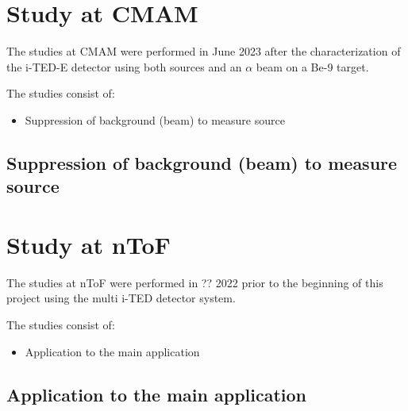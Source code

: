 \section{Study at \ac{CMAM}}

The studies at \ac{CMAM} were performed in June 2023 after the characterization of the \ac{i-TED}-E detector using both sources and an $\alpha$ beam on a Be-9 target.

The studies consist of:
\begin{itemize}
    \item Suppression of background (beam) to measure source
\end{itemize}

\subsection{Suppression of background (beam) to measure source}

\section{Study at \ac{nToF}}

The studies at \ac{nToF} were performed in ?? 2022 prior to the beginning of this project using the multi \ac{i-TED} detector system.

The studies consist of:
\begin{itemize}
    \item Application to the main application
\end{itemize}

\subsection{Application to the main application}
